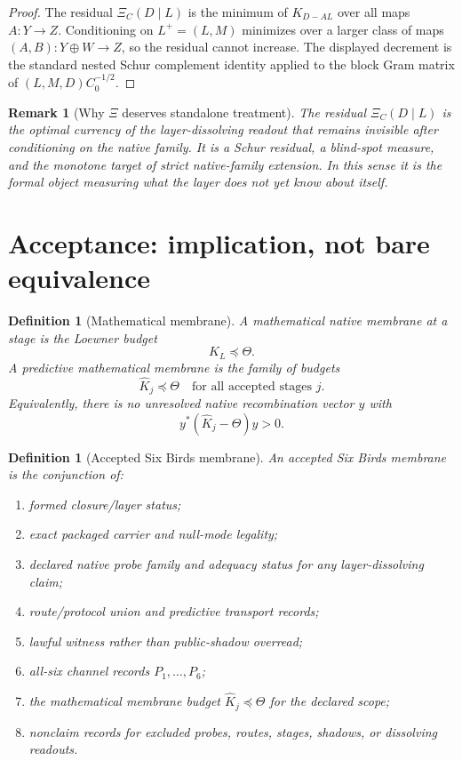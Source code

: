 \documentclass[11pt]{article}
\newtheorem{definition}[theorem]{Definition}
\newtheorem{remark}[theorem]{Remark}
\begin{document}
\begin{proof}
The residual \(\Xi_C(D\mid L)\) is the minimum of \(K_{D-AL}\) over all maps \(A:Y\to Z\).  Conditioning on \(L^+=(L,M)\) minimizes over a larger class of maps \((A,B):Y\oplus W\to Z\), so the residual cannot increase.  The displayed decrement is the standard nested Schur complement identity applied to the block Gram matrix of \((L,M,D)C_0^{-1/2}\).
\end{proof}

\begin{remark}[Why \(\Xi\) deserves standalone treatment]
The residual \(\Xi_C(D\mid L)\) is the optimal currency of the layer-dissolving readout that remains invisible after conditioning on the native family.  It is a Schur residual, a blind-spot measure, and the monotone target of strict native-family extension.  In this sense it is the formal object measuring what the layer does not yet know about itself.
\end{remark}

\section{Acceptance: implication, not bare equivalence}

\begin{definition}[Mathematical membrane]
A mathematical native membrane at a stage is the Loewner budget
\[
  K_L\preceq\Theta.
\]
A predictive mathematical membrane is the family of budgets
\[
  \widehat K_j\preceq\Theta
  \quad\text{for all accepted stages }j.
\]
Equivalently, there is no unresolved native recombination vector \(y\) with
\[
  y^*(\widehat K_j-\Theta)y>0.
\]
\end{definition}

\begin{definition}[Accepted Six Birds membrane]
An accepted Six Birds membrane is the conjunction of:
\begin{enumerate}
  \item formed closure/layer status;
  \item exact packaged carrier and null-mode legality;
  \item declared native probe family and adequacy status for any layer-dissolving claim;
  \item route/protocol union and predictive transport records;
  \item lawful witness rather than public-shadow overread;
  \item all-six channel records \(P_1,\dots,P_6\);
  \item the mathematical membrane budget \(\widehat K_j\preceq\Theta\) for the declared scope;
  \item nonclaim records for excluded probes, routes, stages, shadows, or dissolving readouts.
\end{enumerate}
\end{definition}
\end{document}
